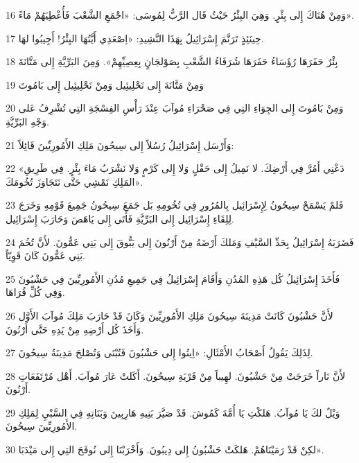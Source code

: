 \par 16 وَمِنْ هُنَاكَ إِلى بِئْرٍ. وَهِيَ البِئْرُ حَيْثُ قَال الرَّبُّ لِمُوسَى: «اجْمَعِ الشَّعْبَ فَأُعْطِيَهُمْ مَاءً».
\par 17 حِينَئِذٍ تَرَنَّمَ إِسْرَائِيلُ بِهَذَا النَّشِيدِ: «اِصْعَدِي أَيَّتُهَا البِئْرُ! أَجِيبُوا لهَا.
\par 18 بِئْرٌ حَفَرَهَا رُؤَسَاءُ حَفَرَهَا شُرَفَاءُ الشَّعْبِ بِصَوْلجَانٍ بِعِصِيِّهِمْ». وَمِنَ البَرِّيَّةِ إِلى مَتَّانَةَ
\par 19 وَمِنْ مَتَّانَةَ إِلى نَحْلِيئِيل وَمِنْ نَحْلِيئِيل إِلى بَامُوتَ
\par 20 وَمِنْ بَامُوتَ إِلى الجِوَاءِ التِي فِي صَحْرَاءِ مُوآبَ عِنْدَ رَأْسِ الفِسْجَةِ التِي تُشْرِفُ عَلى وَجْهِ البَرِّيَّةِ.
\par 21 وَأَرْسَل إِسْرَائِيلُ رُسُلاً إِلى سِيحُونَ مَلِكِ الأَمُورِيِّينَ قَائِلاً:
\par 22 «دَعْنِي أَمُرَّ فِي أَرْضِكَ. لا نَمِيلُ إِلى حَقْلٍ وَلا إِلى كَرْمٍ وَلا نَشْرَبُ مَاءَ بِئْرٍ. فِي طَرِيقِ المَلِكِ نَمْشِي حَتَّى نَتَجَاوَزَ تُخُومَكَ».
\par 23 فَلمْ يَسْمَحْ سِيحُونُ لِإِسْرَائِيل بِالمُرُورِ فِي تُخُومِهِ بَل جَمَعَ سِيحُونُ جَمِيعَ قَوْمِهِ وَخَرَجَ لِلِقَاءِ إِسْرَائِيل إِلى البَرِّيَّةِ فَأَتَى إِلى يَاهَصَ وَحَارَبَ إِسْرَائِيل.
\par 24 فَضَرَبَهُ إِسْرَائِيلُ بِحَدِّ السَّيْفِ وَمَلكَ أَرْضَهُ مِنْ أَرْنُونَ إِلى يَبُّوقَ إِلى بَنِي عَمُّونَ. لأَنَّ تُخُمَ بَنِي عَمُّونَ كَانَ قَوِيّاً.
\par 25 فَأَخَذَ إِسْرَائِيلُ كُل هَذِهِ المُدُنِ وَأَقَامَ إِسْرَائِيلُ فِي جَمِيعِ مُدُنِ الأَمُورِيِّينَ فِي حَشْبُونَ وَفِي كُلِّ قُرَاهَا.
\par 26 لأَنَّ حَشْبُونَ كَانَتْ مَدِينَةَ سِيحُونَ مَلِكِ الأَمُورِيِّينَ وَكَانَ قَدْ حَارَبَ مَلِكَ مُوآبَ الأَوَّل وَأَخَذَ كُل أَرْضِهِ مِنْ يَدِهِ حَتَّى أَرْنُونَ.
\par 27 لِذَلِكَ يَقُولُ أَصْحَابُ الأَمْثَالِ: «اِيتُوا إِلى حَشْبُونَ فَتُبْنَى وَتُصْلحَ مَدِينَةُ سِيحُونَ.
\par 28 لأَنَّ نَاراً خَرَجَتْ مِنْ حَشْبُونَ. لهِيباً مِنْ قَرْيَةِ سِيحُونَ. أَكَلتْ عَارَ مُوآبَ. أَهْل مُرْتَفَعَاتِ أَرْنُونَ.
\par 29 وَيْلٌ لكَ يَا مُوآبُ. هَلكْتِ يَا أُمَّةَ كَمُوشَ. قَدْ صَيَّرَ بَنِيهِ هَارِبِينَ وَبَنَاتِهِ فِي السَّبْيِ لِمَلِكِ الأَمُورِيِّينَ سِيحُونَ.
\par 30 لكِنْ قَدْ رَمَيْنَاهُمْ. هَلكَتْ حَشْبُونُ إِلى دِيبُونَ. وَأَخْرَبْنَا إِلى نُوفَحَ التِي إِلى مَيْدَبَا».
